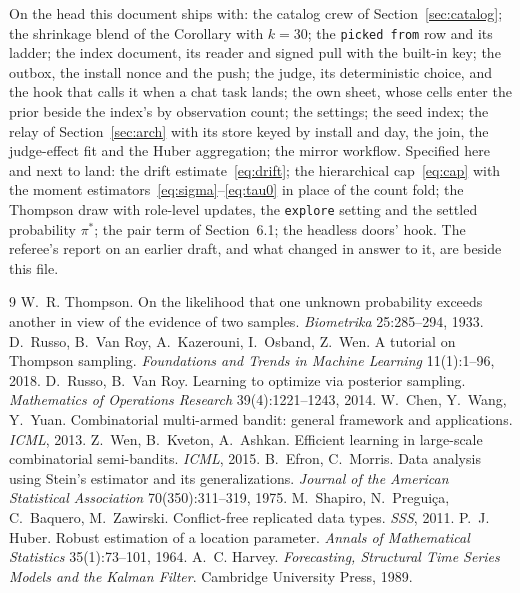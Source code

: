 \documentclass[10pt,a4paper]{article}
\newcommand{\code}[1]{\texttt{#1}}
\theoremstyle{definition}
\theoremstyle{remark}
\begin{document}
On the head this document ships with: the catalog crew of Section~\ref{sec:catalog}; the shrinkage blend of the Corollary with $k=30$; the \code{picked from} row and its ladder; the index document, its reader and signed pull with the built-in key; the outbox, the install nonce and the push; the judge, its deterministic choice, and the hook that calls it when a chat task lands; the own sheet, whose cells enter the prior beside the index's by observation count; the settings; the seed index; the relay of Section~\ref{sec:arch} with its store keyed by install and day, the join, the judge-effect fit and the Huber aggregation; the mirror workflow. Specified here and next to land: the drift estimate~\eqref{eq:drift}; the hierarchical cap~\eqref{eq:cap} with the moment estimators~\eqref{eq:sigma}--\eqref{eq:tau0} in place of the count fold; the Thompson draw with role-level updates, the \code{explore} setting and the settled probability $\pi^\ast$; the pair term of Section~6.1; the headless doors' hook. The referee's report on an earlier draft, and what changed in answer to it, are beside this file.

\begin{thebibliography}{9}\small
{} W.~R. Thompson. On the likelihood that one unknown probability exceeds another in view of the evidence of two samples. \emph{Biometrika} 25:285--294, 1933.
 D.~Russo, B.~Van Roy, A.~Kazerouni, I.~Osband, Z.~Wen. A tutorial on Thompson sampling. \emph{Foundations and Trends in Machine Learning} 11(1):1--96, 2018.
 D.~Russo, B.~Van Roy. Learning to optimize via posterior sampling. \emph{Mathematics of Operations Research} 39(4):1221--1243, 2014.
 W.~Chen, Y.~Wang, Y.~Yuan. Combinatorial multi-armed bandit: general framework and applications. \emph{ICML}, 2013.
 Z.~Wen, B.~Kveton, A.~Ashkan. Efficient learning in large-scale combinatorial semi-bandits. \emph{ICML}, 2015.
 B.~Efron, C.~Morris. Data analysis using Stein's estimator and its generalizations. \emph{Journal of the American Statistical Association} 70(350):311--319, 1975.
 M.~Shapiro, N.~Pregui\c{c}a, C.~Baquero, M.~Zawirski. Conflict-free replicated data types. \emph{SSS}, 2011.
 P.~J. Huber. Robust estimation of a location parameter. \emph{Annals of Mathematical Statistics} 35(1):73--101, 1964.
 A.~C. Harvey. \emph{Forecasting, Structural Time Series Models and the Kalman Filter}. Cambridge University Press, 1989.
\end{thebibliography}
\end{document}
